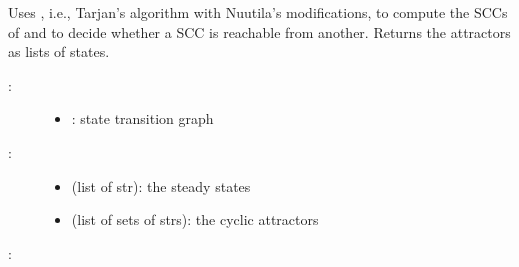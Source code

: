\documentclass[letterpaper,10pt,english]{sphinxmanual}
\begin{document}
\begin{fulllineitems}
\label{\detokenize{AttractorDetection:PyBoolNet.AttractorDetection.compute_attractors_tarjan}}
Uses 
, i.e., Tarjan’s algorithm with Nuutila’s modifications, to compute the SCCs of  and
to decide whether a SCC is reachable from another.
Returns the attractors as lists of states.
\begin{description}
\item[{:}] \leavevmode\begin{itemize}
\item {} 
: state transition graph

\end{itemize}

\item[{:}] \leavevmode\begin{itemize}
\item {} 
 (list of str): the steady states

\item {} 
 (list of sets of strs): the cyclic attractors

\end{itemize}

\end{description}

:


\end{fulllineitems}
\end{document}
